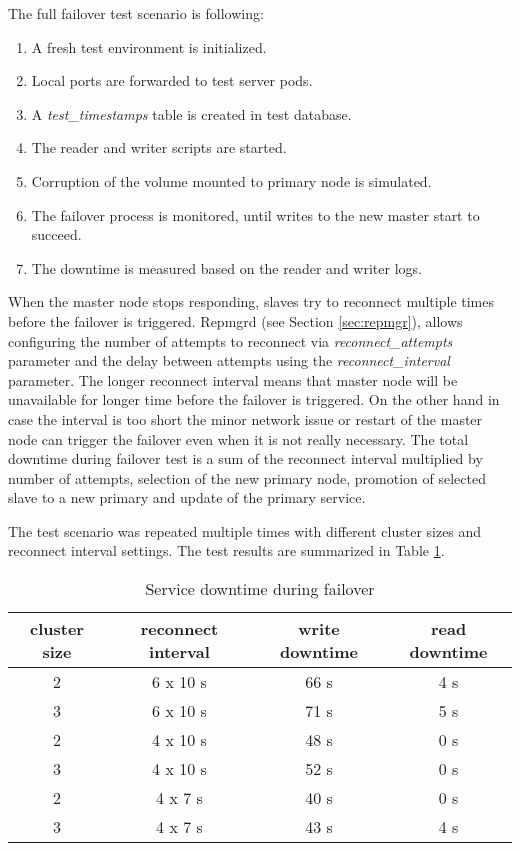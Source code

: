 \documentclass[
  digital, %
  twoside, %
  table,   %
  lof,     %
  lot,     %
]{fithesis3}
\begin{document}
The full failover test scenario is following:
\begin{enumerate}
  \item  A fresh test environment is initialized. 
  \item Local ports are forwarded to test server pods.
  \item A \textit{test\_timestamps} table is created in test database.
  \item The reader and writer scripts are started.
  \item Corruption of the volume mounted to primary node is simulated.
  \item The failover process is monitored, until writes to the new master start to succeed.
  \item The downtime is measured based on the reader and writer logs.
\end{enumerate}

When the master node stops responding, slaves try to reconnect multiple times before the failover is triggered. Repmgrd (see Section \ref{sec:repmgr}), allows configuring the number of attempts to reconnect via \textit{reconnect\_attempts} parameter and the delay between attempts using the \textit{reconnect\_interval} parameter. The longer reconnect interval means that master node will be unavailable for longer time before the failover is triggered. On the other hand in case the interval is too short the minor network issue or restart of the master node can trigger the failover even when it is not really necessary. The total downtime during failover test is a sum of the reconnect interval multiplied by number of attempts, selection of the new primary node, promotion of selected slave to a new primary and update of the primary service.

The test scenario was repeated multiple times with different cluster sizes and reconnect interval settings. The test results are summarized in Table \ref{table:failover_testing}.

\begin{table}[ht!]
\centering
\begin{tabular}{|c c c c|}
 \hline
 cluster size & reconnect interval & write downtime & read downtime \\ [0.5ex]
 \hline
 2 & 6 x 10 s & 66 s & 4 s \\
 3 & 6 x 10 s & 71 s & 5 s \\
 2 & 4 x 10 s & 48 s & 0 s \\
 3 & 4 x 10 s & 52 s & 0 s \\
 2 & 4 x 7 s  & 40 s & 0 s  \\
 3 & 4 x 7 s  & 43 s & 4 s  \\ [1ex]
 \hline
\end{tabular}
\caption{Service downtime during failover}
\label{table:failover_testing}
\end{table}
\end{document}
